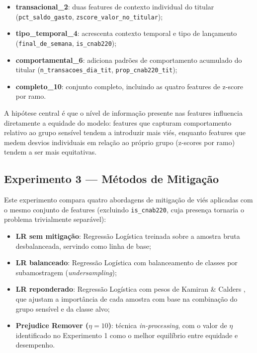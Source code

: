 \begin{itemize}
    \item \textbf{transacional\_2}: duas features de contexto individual do titular (\texttt{pct\_saldo\_gasto}, \texttt{zscore\_valor\_no\_titular});
    \item \textbf{tipo\_temporal\_4}: acrescenta contexto temporal e tipo de lançamento (\texttt{final\_de\_semana}, \texttt{is\_cnab220});
    \item \textbf{comportamental\_6}: adiciona padrões de comportamento acumulado do titular (\texttt{n\_transacoes\_dia\_tit}, \texttt{prop\_cnab220\_tit});
    \item \textbf{completo\_10}: conjunto completo, incluindo as quatro features de z-score por ramo.
\end{itemize}

A hipótese central é que o nível de informação presente nas features influencia diretamente a equidade do modelo: features que capturam comportamento relativo ao grupo sensível tendem a introduzir mais viés, enquanto features que medem desvios individuais em relação ao próprio grupo (z-scores por ramo) tendem a ser mais equitativas.

\subsection{Experimento 3 — Métodos de Mitigação}

Este experimento compara quatro abordagens de mitigação de viés aplicadas com o mesmo conjunto de features (excluindo \texttt{is\_cnab220}, cuja presença tornaria o problema trivialmente separável):

\begin{itemize}
    \item \textbf{LR sem mitigação}: Regressão Logística treinada sobre a amostra bruta desbalanceada, servindo como linha de base;
    \item \textbf{LR balanceado}: Regressão Logística com balanceamento de classes por subamostragem (\textit{undersampling});
    \item \textbf{LR reponderado}: Regressão Logística com pesos de Kamiran \& Calders \cite{kamiran2012data}, que ajustam a importância de cada amostra com base na combinação do grupo sensível e da classe alvo;
    \item \textbf{Prejudice Remover ($\eta = 10$)}: técnica \textit{in-processing}, com o valor de $\eta$ identificado no Experimento 1 como o melhor equilíbrio entre equidade e desempenho.
\end{itemize}
